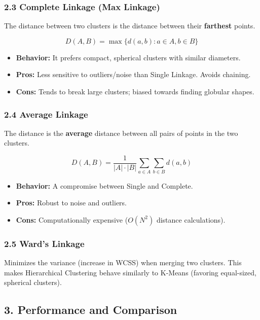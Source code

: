 \documentclass[
  italian,
  11pt,
]{article}
\begin{document}
\subsubsection{2.3 Complete Linkage (Max
Linkage)}\label{complete-linkage-max-linkage}

The distance between two clusters is the distance between their
\textbf{farthest} points.

\[D(A, B) = \max \{ d(a, b) : a \in A, b \in B \}\]

\begin{itemize}
\item
  \textbf{Behavior:} It prefers compact, spherical clusters with similar
  diameters.
\item
  \textbf{Pros:} Less sensitive to outliers/noise than Single Linkage.
  Avoids chaining.
\item
  \textbf{Cons:} Tends to break large clusters; biased towards finding
  globular shapes.
\end{itemize}

\subsubsection{2.4 Average Linkage}\label{average-linkage}

The distance is the \textbf{average} distance between all pairs of
points in the two clusters.

\[D(A, B) = \frac{1}{|A| \cdot |B|} \sum_{a \in A} \sum_{b \in B} d(a, b)\]

\begin{itemize}
\item
  \textbf{Behavior:} A compromise between Single and Complete.
\item
  \textbf{Pros:} Robust to noise and outliers.
\item
  \textbf{Cons:} Computationally expensive (\(O(N^2)\) distance
  calculations).
\end{itemize}

\subsubsection{2.5 Ward's Linkage}\label{wards-linkage}

Minimizes the variance (increase in WCSS) when merging two clusters.
This makes Hierarchical Clustering behave similarly to K-Means (favoring
equal-sized, spherical clusters).

\subsection{3. Performance and
Comparison}\label{performance-and-comparison}
\end{document}
